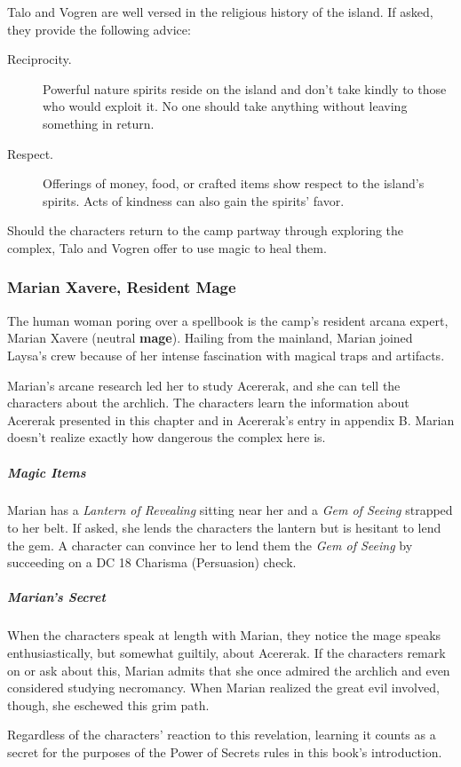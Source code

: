\documentclass[10pt,a4paper,twoside,bg=print,twocolumn,openany,nodeprecatedcode]{dndbook}
\begin{document}
Talo and Vogren are well versed in the religious history of the island. If asked, they provide the following advice:


\begin{description}
\item[Reciprocity.]
Powerful nature spirits reside on the island and don't take kindly to those who would exploit it. No one should take anything without leaving something in return.
\item[Respect.]
Offerings of money, food, or crafted items show respect to the island's spirits. Acts of kindness can also gain the spirits' favor.
\end{description}

Should the characters return to the camp partway through exploring the complex, Talo and Vogren offer to use magic to heal them.

\subsubsection{Marian Xavere, Resident Mage}
The human woman poring over a spellbook is the camp's resident arcana expert, Marian Xavere (neutral \textbf{mage}). Hailing from the mainland, Marian joined Laysa's crew because of her intense fascination with magical traps and artifacts.

Marian's arcane research led her to study Acererak, and she can tell the characters about the archlich. The characters learn the information about Acererak presented in this chapter and in Acererak's entry in appendix B. Marian doesn't realize exactly how dangerous the complex here is.

\subparagraph{Magic Items}
Marian has a \textit{Lantern of Revealing} sitting near her and a \textit{Gem of Seeing} strapped to her belt. If asked, she lends the characters the lantern but is hesitant to lend the gem. A character can convince her to lend them the \textit{Gem of Seeing} by succeeding on a DC 18 Charisma (Persuasion) check.

\subparagraph{Marian's Secret}
When the characters speak at length with Marian, they notice the mage speaks enthusiastically, but somewhat guiltily, about Acererak. If the characters remark on or ask about this, Marian admits that she once admired the archlich and even considered studying necromancy. When Marian realized the great evil involved, though, she eschewed this grim path.

Regardless of the characters' reaction to this revelation, learning it counts as a secret for the purposes of the Power of Secrets rules in this book's introduction.
\end{document}

